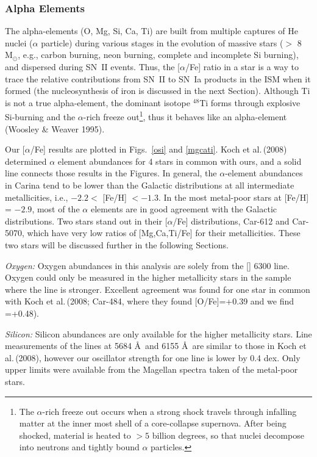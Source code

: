 \documentclass{emulateapj}
\newcommand\etal{{\rm et al.\,}}
\begin{document}
\subsubsection {Alpha Elements}

The alpha-elements (O, Mg, Si, Ca, Ti) are built from multiple 
captures of He nuclei ($\alpha$ particle) during various stages
in the evolution of massive stars ($>$ 8 M$_\odot$, 
e.g., carbon burning, neon burning, complete and incomplete Si burning),
and dispersed during SN~II events.    Thus, the [$\alpha$/Fe] ratio
in a star
is a way to trace the relative contributions from SN~II to SN~Ia 
products in the ISM when it formed (the nucleosynthesis of iron is
discussed in the next Section). 
Although Ti is not a true alpha-element, the dominant isotope 
$^{48}$Ti forms through explosive Si-burning and the 
$\alpha$-rich freeze out\footnote{The $\alpha$-rich freeze out 
occurs when a strong shock travels through infalling matter at the 
inner most shell of a core-collapse supernova.   After being shocked,
material is heated to $>5$ billion degrees, so that nuclei decompose
into neutrons and tightly bound $\alpha$ particles.}, 
thus it behaves like an alpha-element (Woosley \& Weaver 1995). 

Our [$\alpha$/Fe] results are plotted in Figs.~\ref{osi} and \ref{mgcati}.
Koch \etal (2008) determined $\alpha$ element abundances for 4
stars in common with ours, and a solid line connects those results
in the Figures.
In general, the $\alpha$-element abundances in Carina tend to be lower 
than the Galactic distributions at all intermediate metallicities, 
i.e., $-2.2 <$ [Fe/H] $< -1.3$.  
In the most metal-poor stars at 
[Fe/H] = $-2.9$, most of the $\alpha$ elements are in good 
agreement with the Galactic distributions.   
Two stars stand out in their [$\alpha$/Fe] distributions,
Car-612 and Car-5070, which have very low ratios of
[Mg,Ca,Ti/Fe] for their metallicities.   These two stars
will be discussed further in the following Sections. 

{\it Oxygen:} Oxygen abundances in this analysis are solely from 
the [] 6300 line.    Oxygen could only be measured in the 
higher metallicity stars in the sample where the line is stronger.    
Excellent agreement was found for one star in common with Koch \etal (2008;
Car-484, where they found [O/Fe]=+0.39 and we find =+0.48).

{\it Silicon:} Silicon abundances are only available for the 
higher metallicity stars.    Line measurements of the
 lines at 5684 \AA\ and 6155 \AA\ are similar
to those in Koch \etal (2008), however our oscillator strength for one line
is lower by 0.4 dex.   
Only upper limits were available from the Magellan spectra
taken of the metal-poor stars.
\end{document}
